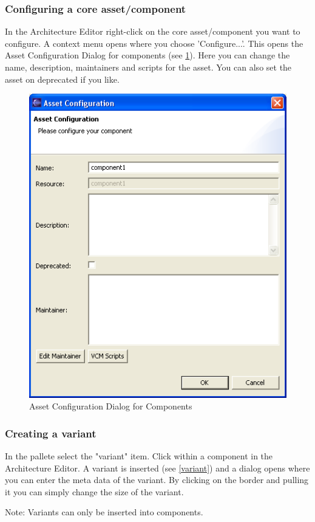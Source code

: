 \subsubsection{Configuring a core asset/component}
In the Architecture Editor right-click on the core asset/component you want to configure. 
A context menu opens where you choose 'Configure...'. This opens the Asset Configuration Dialog
for components (see \ref{configcomp}). Here you can change the name, description, maintainers and scripts for the
asset. You can also set the asset on deprecated if you like.

\begin{figure}[h!]
\begin{center}
\includegraphics[width=12cm]{configcomp.png}
   \caption{Asset Configuration Dialog for Components}
\label{configcomp}
\end{center}
\end{figure}\par

\subsubsection{Creating a variant}

In the pallete select the "variant" item. Click within a component in 
the Architecture Editor. A variant is inserted (see \ref{variant}) and a dialog opens where you can enter the meta data of
the variant. By clicking on the border and pulling it you can simply change the size of the variant. \par
Note: Variants can only be inserted into components.

